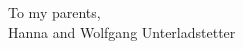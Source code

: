 \addchap{}
\begin{refsection}

\vspace*{2in}
\begin{center}To my parents, \\ Hanna and Wolfgang Unterladstetter
\end{center}

\printbibliography[heading=subbibliography]
\end{refsection}